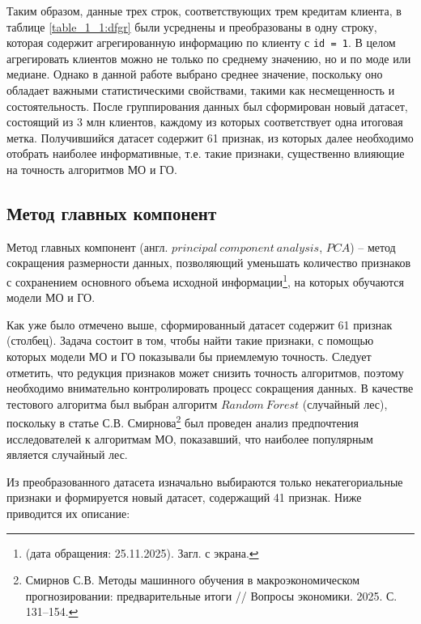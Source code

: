         Таким образом, данные трех строк, соответствующих трем кредитам клиента, в таблице \ref{table_1_1:dfgr} были усреднены и преобразованы в одну строку, которая содержит агрегированную информацию по клиенту с \texttt{id = 1}. В целом агрегировать клиентов можно не только по среднему значению, но и по моде или медиане. Однако в данной работе выбрано среднее значение, поскольку оно обладает важными статистическими свойствами, такими как несмещенность и состоятельность. После группирования данных был сформирован новый датасет, состоящий из 3 млн клиентов, каждому из которых соответствует одна итоговая метка. Получившийся датасет содержит 61 признак, из которых далее необходимо отобрать наиболее информативные, т.е. такие признаки, существенно влияющие на точность алгоритмов МО и ГО.
        
        
\subsection{Метод главных компонент}

Метод главных компонент (англ. $principal\ component\ analysis$, $PCA$) -- метод сокращения размерности данных, позволяющий уменьшать количество признаков с сохранением основного объема исходной информации\footnote{\cite{PCA} (дата обращения: 25.11.2025). Загл. с экрана.}, на которых обучаются модели МО и ГО.

Как уже было отмечено выше, сформированный датасет содержит 61 признак (столбец). Задача состоит в том, чтобы найти такие признаки, с помощью которых модели МО и ГО показывали бы приемлемую точность. Следует отметить, что редукция признаков может снизить точность алгоритмов, поэтому необходимо внимательно контролировать процесс сокращения данных. В качестве тестового алгоритма был выбран алгоритм $Random\ Forest$ (случайный лес), поскольку в статье С.В. Смирнова\footnote{Смирнов С.В. Методы машинного обучения в макроэкономическом прогнозировании: предварительные итоги // Вопросы экономики. 2025. С. 131--154.}
был проведен анализ предпочтения исследователей к алгоритмам МО, показавший, что наиболее популярным является случайный лес.

Из преобразованного датасета изначально выбираются только некатегориальные признаки и формируется новый датасет, содержащий 41 признак. Ниже приводится их описание:

